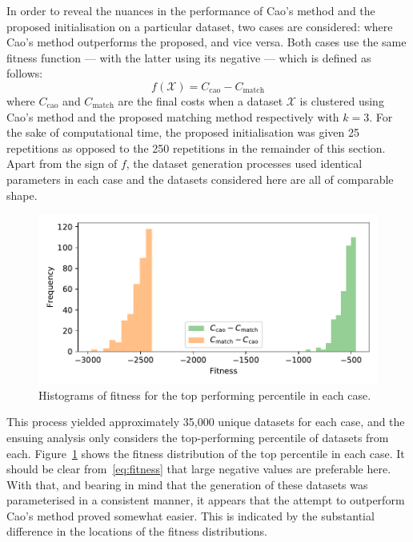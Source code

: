 \documentclass[11pt]{article}
\newcommand{\imgwidth}{.85\textwidth}
\begin{document}
In order to reveal the nuances in the performance of Cao's method and the
proposed initialisation on a particular dataset, two cases are considered:
where Cao's method outperforms the proposed, and vice versa. Both cases use the
same fitness function --- with the latter using its negative --- which is
defined as follows:
\begin{equation}\label{eq:fitness}
    f\left(\mathcal X\right) = C_{\mathrm{cao}} - C_{\mathrm{match}}
\end{equation}
where \(C_{\mathrm{cao}}\) and \(C_{\mathrm{match}}\) are the final costs when a
dataset \(\mathcal X\) is clustered using Cao's method and the proposed matching
method respectively with \(k = 3\). For the sake of computational time, the
proposed initialisation was given 25 repetitions as opposed to the 250
repetitions in the remainder of this section. Apart from the sign of \(f\), the
dataset generation processes used identical parameters in each case and the
datasets considered here are all of comparable shape.

\begin{figure}
    \centering
    \includegraphics[width=\imgwidth]{Fig9.pdf}
    \caption{Histograms of fitness for the top performing percentile in each
             case.}\label{fig:fitness}
\end{figure}

This process yielded approximately 35,000 unique datasets for each case, and the
ensuing analysis only considers the top-performing percentile of datasets from
each. Figure~\ref{fig:fitness} shows the fitness distribution of the top
percentile in each case. It should be clear from~\eqref{eq:fitness} that large
negative values are preferable here. With that, and bearing in mind that the
generation of these datasets was parameterised in a consistent manner, it
appears that the attempt to outperform Cao's method proved somewhat easier. This
is indicated by the substantial difference in the locations of the fitness
distributions.
\end{document}
